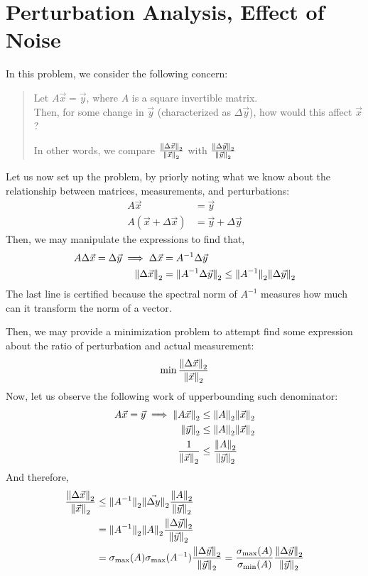 \section{Perturbation Analysis, Effect of Noise}
In this problem, we consider the following concern:
\begin{quote}
    Let $A \vec{x} = \vec{y}$, where $A$ is a square invertible matrix. \\
    Then, for some change in $\vec{y}$ (characterized as $\Delta \vec{y}$), how would this affect $\vec{x}$?
    \par
    In other words, we compare $\frac{{\| \Delta \vec{x} \|}_{2}^{}}{{\| \vec{x} \|}_{2}^{}}$ with $\frac{{\| \Delta \vec{y} \|}_{2}^{}}{{\| \vec{y} \|}_{2}^{}}$
\end{quote}
Let us now set up the problem, by priorly noting what we know about the relationship between matrices, measurements, and perturbations:
\begin{align*}
    A \vec{x} &= \vec{y} \\
    A (\vec{x} + \Delta \vec{x}) &= \vec{y} + \Delta \vec{y}
\end{align*}
Then, we may manipulate the expressions to find that,
\begin{align*}
    A \Delta \vec{x} = \Delta \vec{y} \implies \Delta \vec{x} &= A^{-1} \Delta \vec{y} \\
    {\| \Delta \vec{x} \|}_{2}^{} &= {\| A^{-1} \Delta \vec{y} \|}_{2}^{} \leq {\| A^{-1} \|}_{2}^{} {\| \Delta \vec{y} \|}_{2}^{}
\end{align*}
The last line is certified because the spectral norm of $A^{-1}$ measures how much can it transform the norm of a vector.
\par
Then, we may provide a minimization problem to attempt find some expression about the ratio of perturbation and actual measurement:
\[
    \min \frac{{\| \Delta \vec{x} \|}_{2}^{}}{{\| \vec{x} \|}_{2}^{}}
\]
Now, let us observe the following work of upperbounding such denominator:
\begin{align*}
    A \vec{x} = \vec{y} \implies {\| A \vec{x} \|}_{2}^{} &\leq {\| A \|}_{2}^{} {\| \vec{x} \|}_{2}^{} \\
    {\| \vec{y} \|}_{2}^{} &\leq {\| A \|}_{2}^{} {\| \vec{x} \|}_{2}^{} \\
    \frac{1}{{\| \vec{x} \|}_{2}^{}} &\leq \frac{{\| A \|}_{2}^{}}{{\| \vec{y} \|}_{2}^{}}
\end{align*}
And therefore,
\begin{align*}
    \frac{{\| \Delta \vec{x} \|}_{2}^{}}{{\| \vec{x} \|}_{2}^{}}
    &\leq {\| A^{-1} \|}_{2}^{} {\| \vec{\Delta y} \|}_{2}^{} \frac{{\| A \|}_{2}^{}}{{\| \vec{y} \|}_{2}^{}} \\
    &= {\| A^{-1} \|}_{2}^{} {\| A \|}_{2}^{} \frac{{\| \Delta \vec{y} \|}_{2}^{}}{{\| \vec{y} \|}_{2}^{}} \\
    &= \sigma_{\max}(A) \sigma_{\max}(A^{-1}) \frac{{\| \Delta \vec{y} \|}_{2}^{}}{{\| \vec{y} \|}_{2}^{}}
    = \frac{\sigma_{\max}(A)}{\sigma_{\min}(A)} \frac{{\| \Delta \vec{y} \|}_{2}^{}}{{\| \vec{y} \|}_{2}^{}}
\end{align*}
